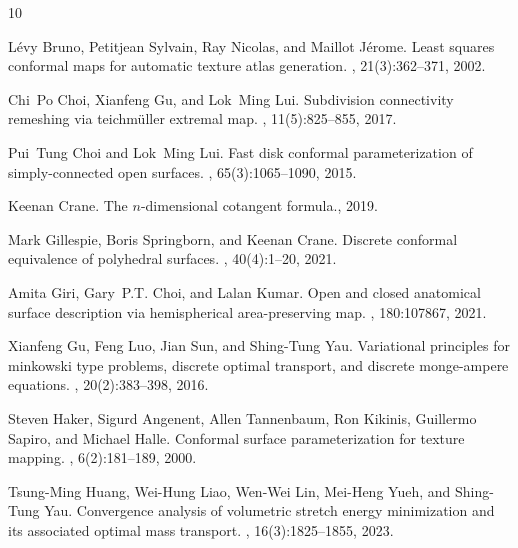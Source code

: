\documentclass{article}
\begin{document}


%
%

\begin{thebibliography}{10}

L{\'e}vy Bruno, Petitjean Sylvain, Ray Nicolas, and Maillot J{\'e}rome.
\newblock Least squares conformal maps for automatic texture atlas generation.
, 21(3):362--371, 2002.

Chi~Po Choi, Xianfeng Gu, and Lok~Ming Lui.
\newblock Subdivision connectivity remeshing via teichm\"{u}ller extremal map.
, 11(5):825–855, 2017.

Pui~Tung Choi and Lok~Ming Lui.
\newblock Fast disk conformal parameterization of simply-connected open
  surfaces.
, 65(3):1065--1090, 2015.

Keenan Crane.
\newblock The $n$-dimensional cotangent formula., 2019.

Mark Gillespie, Boris Springborn, and Keenan Crane.
\newblock Discrete conformal equivalence of polyhedral surfaces.
, 40(4):1--20, 2021.

Amita Giri, Gary~P.T. Choi, and Lalan Kumar.
\newblock Open and closed anatomical surface description via hemispherical
  area-preserving map.
, 180:107867, 2021.

Xianfeng Gu, Feng Luo, Jian Sun, and Shing-Tung Yau.
\newblock Variational principles for minkowski type problems, discrete optimal
  transport, and discrete monge-ampere equations.
, 20(2):383--398, 2016.

Steven Haker, Sigurd Angenent, Allen Tannenbaum, Ron Kikinis, Guillermo Sapiro,
  and Michael Halle.
\newblock Conformal surface parameterization for texture mapping.
,
  6(2):181--189, 2000.

Tsung-Ming Huang, Wei-Hung Liao, Wen-Wei Lin, Mei-Heng Yueh, and Shing-Tung
  Yau.
\newblock Convergence analysis of volumetric stretch energy minimization and
  its associated optimal mass transport.
, 16(3):1825--1855, 2023.


\end{thebibliography}
\end{document}
